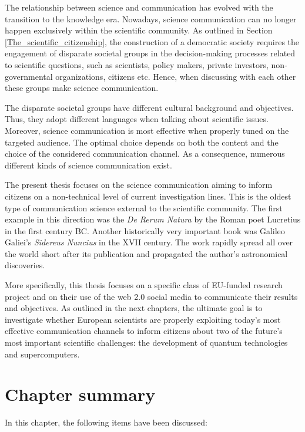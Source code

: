 The relationship between science and communication has evolved with the transition to the knowledge era. Nowadays, science communication can no longer happen exclusively within the scientific community. As outlined in Section \ref{The_scientific_citizenship}, the construction of a democratic society requires the engagement of disparate societal groups in the decision-making processes related to scientific questions, such as scientists, policy makers, private investors, non-governmental organizations, citizens etc. Hence, when discussing with each other these groups make science communication.

The disparate societal groups have different cultural background and objectives. Thus, they adopt different languages when talking about scientific issues. Moreover, science communication is most effective when properly tuned on the targeted audience. The optimal choice depends on both the content and the choice of the considered communication channel. As a consequence, numerous different kinds of science communication exist.   

The present thesis focuses on the science communication aiming to inform citizens on a non-technical level of current investigation lines. This is the oldest type of communication science external to the scientific community. The first example in this direction was the \textit{De Rerum Natura} by the Roman poet Lucretius in the first century BC. Another historically very important book was Galileo Galiei's \textit{Sidereus Nuncius} in the XVII century. The work rapidly spread all over the world short after its publication and propagated the author's astronomical discoveries.

More specifically, this thesis focuses on a specific class of EU-funded research project and on their use of the web 2.0 social media to communicate their results and objectives. As outlined in the next chapters, the ultimate goal is to investigate whether European scientists are properly exploiting today's most effective communication channels to inform citizens about two of the future's most important scientific challenges: the development of quantum technologies and supercomputers.

\section{Chapter summary} 
In this chapter, the following items have been discussed:

